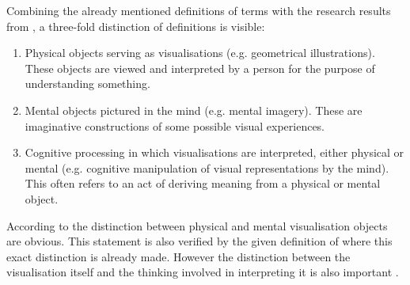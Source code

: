 

Combining the already mentioned definitions of terms with the research results from \citeauthor{Phillips2010}, a three-fold distinction of definitions is visible:
\begin{enumerate}
\item Physical objects serving as visualisations (e.g. geometrical illustrations). These objects are viewed and interpreted by a person for the purpose of understanding something.
\item Mental objects pictured in the mind (e.g. mental imagery). These are imaginative constructions of some possible visual experiences.
\item Cognitive processing in which visualisations are interpreted, either physical or mental (e.g. cognitive manipulation of visual representations by the mind). This often refers to an act of deriving meaning from a physical or mental object.
\end{enumerate}

According to \citeauthor{Phillips2010} the distinction between physical and mental visualisation objects are obvious. This statement is also verified by the given definition of \citeauthor{mccormick:1987} where this exact distinction is already made. However the distinction between the visualisation itself and the thinking involved in interpreting it is also important .